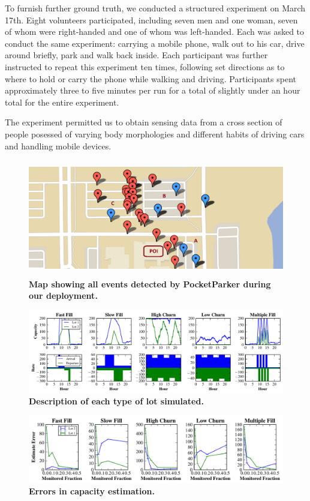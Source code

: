 To furnish further ground truth, we conducted a structured experiment on March
17th. Eight volunteers participated, including seven men and one woman, seven 
of whom were right-handed and one of whom was left-handed.
Each was asked to conduct the same experiment:  carrying a mobile phone, walk
out to his car, drive around briefly, park and walk back inside.  Each
participant was further instructed to repeat this experiment ten times,
following set directions as to where to hold or carry the phone while walking
and driving.  Participants spent approximately three to five minutes per run
for a total of slightly under an hour total for the entire experiment.

The experiment permitted us to obtain sensing data from a cross section of
people posessed of varying body morphologies and different habits of driving
cars and handling mobile devices.


\begin{figure}
\centering
\includegraphics[width=\textwidth,height=2in]{./figures/detectedEventsOnMap.pdf}

\caption{\textbf{Map showing all events detected by PocketParker during our
deployment.} }

\label{fig-energy}
\end{figure}

\begin{figure}
\centering
\includegraphics[width=\textwidth]{./simulator/figures/lots.pdf}

\caption{\textbf{Description of each type of lot simulated.} }

\label{fig-lotsdescription}
\end{figure}

\begin{figure}
\centering
\includegraphics[width=\textwidth]{./simulator/figures/capacity_experiment.pdf}

\caption{\textbf{Errors in capacity estimation.} }

\label{fig-lotsdescription}
\end{figure}

